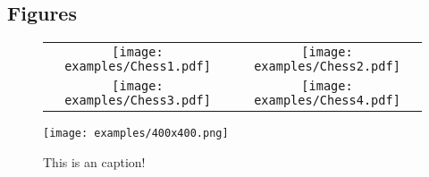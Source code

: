 \subsection{Figures}
\begin{figure}[htb]
    \centering
    \begin{tabular}{cc}
        \texttt{[image: examples/Chess1.pdf]} &
        \texttt{[image: examples/Chess2.pdf]} \\
        \texttt{[image: examples/Chess3.pdf]} &
        \texttt{[image: examples/Chess4.pdf]}
    \end{tabular}
\end{figure}

\begin{figure}[htb]
    \centering
    \texttt{[image: examples/400x400.png]}
    \caption{This is an caption!}
\end{figure}


